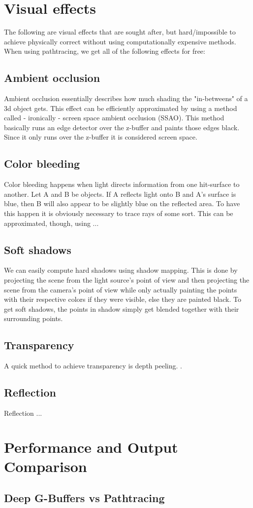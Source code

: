 \documentclass{ACGSeminar}
\begin{document}
\section{Visual effects}
	The following are visual effects that are sought after, but hard/impossible to achieve physically correct without using
	computationally expensive methods. When using pathtracing, we get all of the following effects for free: 
	\subsection{Ambient occlusion}
		Ambient occlusion essentially describes how much shading the "in-betweens" of a 3d object gets. This effect can be efficiently approximated by using a method called - ironically - screen space ambient occlusion (SSAO). This method basically runs an edge detector over the z-buffer and paints those edges black. Since it only runs over the z-buffer it is considered screen space.
	\subsection{Color bleeding}
		Color bleeding happens when light directs information from one hit-surface to another. Let A and B be objects. If A reflects light onto B and A's surface is blue, then B will also appear
		to be slightly blue on the reflected area. To have this happen it is obviously necessary to trace rays of some sort. This can be approximated, though, using ... %
	\subsection{Soft shadows}
		We can easily compute hard shadows using shadow mapping. This is done by projecting the scene from the light source's point of view and then projecting the scene from the camera's point of view while only actually painting the points with their respective colors if they were visible, else they are painted black. To get soft shadows, the points in shadow simply get blended together with their surrounding points.
	\subsection{Transparency}
		A quick method to achieve transparency is depth peeling. \cite{NOIT}.

	\subsection{Reflection}
		Reflection ...

\section{Performance and Output Comparison}
	\subsection{Deep G-Buffers vs Pathtracing}

\printbibliography
\end{document}
